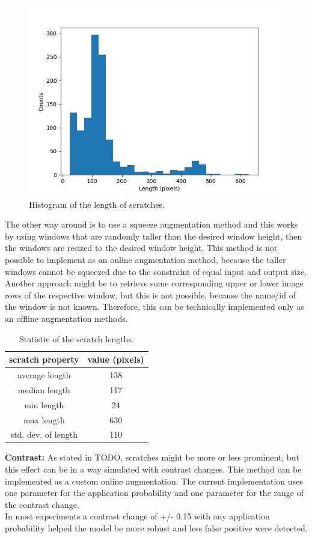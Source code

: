 \begin{figure}[!h]
\centering
\captionsetup{justification=centering,margin=2cm}
\includegraphics[width=0.6\columnwidth]{images/implementation/augmentations/scratch_length_histo}
\caption{Histogram of the length of scratches.}
\label{asdfsdf}
\end{figure}

The other way around is to use a squeeze augmentation method and this works by using windows that are randomly taller than the desired window height, then the windows are resized to the desired window height. This method is not possible to implement as an online augmentation method, because the taller windows cannot be squeezed due to the constraint of equal input and output size. Another approach might be to retrieve some corresponding upper or lower image rows of the respective window, but this is not possible, because the name/id of the window is not known. Therefore, this can be technically implemented only as an offline augmentation methods. \\

\begin{table}[!h]
\centering
\begin{tabular}{ ||c|c||}
\hline
scratch property & value (pixels)\\ [0.5ex]
\hline\hline
average length & 138 \\
median length & 117 \\
min length & 24 \\
max length & 630 \\
std. dev. of length & 110 \\
\hline
\end{tabular}
\label{impl:scratch_prop}
\caption{Statistic of the scratch lengths.}
\end{table}


\textbf{Contrast:} As stated in TODO, scratches might be more or less prominent, but this effect can be in a way simulated with contrast changes. This method can be implemented as a custom online augmentation. The current implementation uses one parameter for the application probability and one parameter for the range of the contrast change. \\
In most experiments a contrast change of +/- 0.15 with any application probability helped the model be more robust and less false positive were detected. \\

